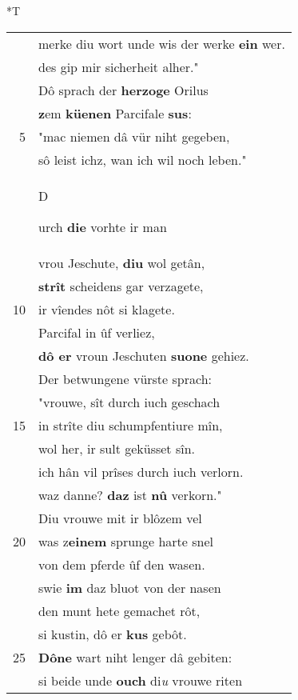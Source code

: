 \documentclass[8pt,a4paper,notitlepage]{article}
\begin{document}
\begin{table}[ht]
\begin{minipage}[t]{0.5\linewidth}
\end{minipage}
\hspace{0.5cm}
\begin{minipage}[t]{0.5\linewidth}
\small
\begin{center}*T
\end{center}
\begin{tabular}{rl}
 & merke diu wort unde wis der werke \textbf{ein} wer.\\ 
 & des gip mir sicherheit alher."\\ 
 & Dô sprach der \textbf{herzoge} Orilus\\ 
 & \textbf{z}em \textbf{küenen} Parcifale \textbf{sus}:\\ 
5 & "mac niemen dâ vür niht gegeben,\\ 
 & sô leist ichz, wan ich wil noch leben."\\ 
 & \begin{large}D\end{large}urch \textbf{die} vorhte ir man\\ 
 & vrou Jeschute, \textbf{diu} wol getân,\\ 
 & \textbf{strît} scheidens gar verzagete,\\ 
10 & ir vîendes nôt si klagete.\\ 
 & Parcifal in ûf verliez,\\ 
 & \textbf{dô er} vroun Jeschuten \textbf{suone} gehiez.\\ 
 & Der betwungene vürste sprach:\\ 
 & "vrouwe, sît durch iuch geschach\\ 
15 & in strîte diu schumpfentiure mîn,\\ 
 & wol her, ir sult geküsset sîn.\\ 
 & ich hân vil prîses durch iuch verlorn.\\ 
 & waz danne? \textbf{daz} ist \textbf{nû} verkorn."\\ 
 & Diu vrouwe mit ir blôzem vel\\ 
20 & was z\textbf{einem} sprunge harte snel\\ 
 & von dem pferde ûf den wasen.\\ 
 & swie \textbf{im} daz bluot von der nasen\\ 
 & den munt hete gemachet rôt,\\ 
 & si kustin, dô er \textbf{kus} gebôt.\\ 
25 & \textbf{Dô}\textbf{ne} wart niht lenger dâ gebiten:\\ 
 & si beide unde \textbf{ouch} di\textit{u} vrouwe riten\\ 

\end{tabular}
\end{minipage}
\end{table}
\end{document}
